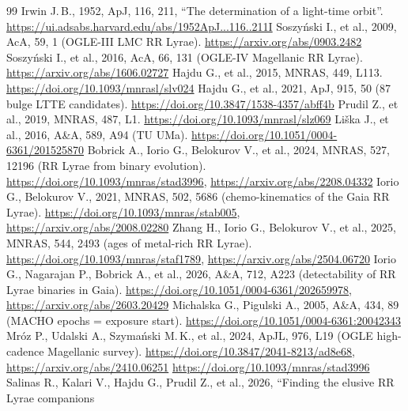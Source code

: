 \documentclass[11pt]{article}
\begin{document}
\begin{thebibliography}{99}\small
{} Irwin J.\,B., 1952, ApJ, 116, 211, ``The determination of a light-time orbit''.
\url{https://ui.adsabs.harvard.edu/abs/1952ApJ...116..211I}
 Soszy\'nski I., et al., 2009, AcA, 59, 1 (OGLE-III LMC RR Lyrae).
\url{https://arxiv.org/abs/0903.2482}
 Soszy\'nski I., et al., 2016, AcA, 66, 131 (OGLE-IV Magellanic RR Lyrae).
\url{https://arxiv.org/abs/1606.02727}
 Hajdu G., et al., 2015, MNRAS, 449, L113. \url{https://doi.org/10.1093/mnrasl/slv024}
 Hajdu G., et al., 2021, ApJ, 915, 50 (87 bulge LTTE candidates).
\url{https://doi.org/10.3847/1538-4357/abff4b}
 Prudil Z., et al., 2019, MNRAS, 487, L1. \url{https://doi.org/10.1093/mnrasl/slz069}
 Li\v{s}ka J., et al., 2016, A\&A, 589, A94 (TU UMa).
\url{https://doi.org/10.1051/0004-6361/201525870}
 Bobrick A., Iorio G., Belokurov V., et al., 2024, MNRAS, 527, 12196 (RR Lyrae from binary evolution). \url{https://doi.org/10.1093/mnras/stad3996}, \url{https://arxiv.org/abs/2208.04332}
 Iorio G., Belokurov V., 2021, MNRAS, 502, 5686 (chemo-kinematics of the Gaia RR Lyrae). \url{https://doi.org/10.1093/mnras/stab005}, \url{https://arxiv.org/abs/2008.02280}
 Zhang H., Iorio G., Belokurov V., et al., 2025, MNRAS, 544, 2493 (ages of metal-rich RR Lyrae). \url{https://doi.org/10.1093/mnras/staf1789}, \url{https://arxiv.org/abs/2504.06720}
 Iorio G., Nagarajan P., Bobrick A., et al., 2026, A\&A, 712, A223 (detectability of RR Lyrae binaries in Gaia). \url{https://doi.org/10.1051/0004-6361/202659978}, \url{https://arxiv.org/abs/2603.20429}
 Michalska G., Pigulski A., 2005, A\&A, 434, 89 (MACHO epochs = exposure start). \url{https://doi.org/10.1051/0004-6361:20042343}
 Mr\'oz P., Udalski A., Szyma\'nski M.\,K., et al., 2024, ApJL, 976, L19 (OGLE high-cadence Magellanic survey). \url{https://doi.org/10.3847/2041-8213/ad8e68}, \url{https://arxiv.org/abs/2410.06251}
\url{https://doi.org/10.1093/mnras/stad3996}
 Salinas R., Kalari V., Hajdu G., Prudil Z., et al., 2026, ``Finding the elusive RR Lyrae companions

\end{thebibliography}
\end{document}
